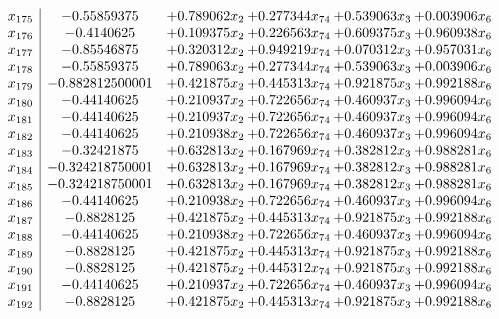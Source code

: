 \documentclass[11pt]{article}
\begin{document}
\[\begin{array}{c| c c@{\hskip 2pt} c@{\hskip 2pt} c@{\hskip 2pt} c@{\hskip 2pt} }
 x_{175}   &  -0.55859375 & + 0.789062 x_{2} & + 0.277344 x_{74} & + 0.539063 x_{3} & + 0.003906 x_{6}\\
 x_{176}   &  -0.4140625 & + 0.109375 x_{2} & + 0.226563 x_{74} & + 0.609375 x_{3} & + 0.960938 x_{6}\\
 x_{177}   &  -0.85546875 & + 0.320312 x_{2} & + 0.949219 x_{74} & + 0.070312 x_{3} & + 0.957031 x_{6}\\
 x_{178}   &  -0.55859375 & + 0.789063 x_{2} & + 0.277344 x_{74} & + 0.539063 x_{3} & + 0.003906 x_{6}\\
 x_{179}   &  -0.882812500001 & + 0.421875 x_{2} & + 0.445313 x_{74} & + 0.921875 x_{3} & + 0.992188 x_{6}\\
 x_{180}   &  -0.44140625 & + 0.210937 x_{2} & + 0.722656 x_{74} & + 0.460937 x_{3} & + 0.996094 x_{6}\\
 x_{181}   &  -0.44140625 & + 0.210937 x_{2} & + 0.722656 x_{74} & + 0.460937 x_{3} & + 0.996094 x_{6}\\
 x_{182}   &  -0.44140625 & + 0.210938 x_{2} & + 0.722656 x_{74} & + 0.460937 x_{3} & + 0.996094 x_{6}\\
 x_{183}   &  -0.32421875 & + 0.632813 x_{2} & + 0.167969 x_{74} & + 0.382812 x_{3} & + 0.988281 x_{6}\\
 x_{184}   &  -0.324218750001 & + 0.632813 x_{2} & + 0.167969 x_{74} & + 0.382812 x_{3} & + 0.988281 x_{6}\\
 x_{185}   &  -0.324218750001 & + 0.632813 x_{2} & + 0.167969 x_{74} & + 0.382812 x_{3} & + 0.988281 x_{6}\\
 x_{186}   &  -0.44140625 & + 0.210938 x_{2} & + 0.722656 x_{74} & + 0.460937 x_{3} & + 0.996094 x_{6}\\
 x_{187}   &  -0.8828125 & + 0.421875 x_{2} & + 0.445313 x_{74} & + 0.921875 x_{3} & + 0.992188 x_{6}\\
 x_{188}   &  -0.44140625 & + 0.210938 x_{2} & + 0.722656 x_{74} & + 0.460937 x_{3} & + 0.996094 x_{6}\\
 x_{189}   &  -0.8828125 & + 0.421875 x_{2} & + 0.445313 x_{74} & + 0.921875 x_{3} & + 0.992188 x_{6}\\
 x_{190}   &  -0.8828125 & + 0.421875 x_{2} & + 0.445312 x_{74} & + 0.921875 x_{3} & + 0.992188 x_{6}\\
 x_{191}   &  -0.44140625 & + 0.210937 x_{2} & + 0.722656 x_{74} & + 0.460937 x_{3} & + 0.996094 x_{6}\\
 x_{192}   &  -0.8828125 & + 0.421875 x_{2} & + 0.445313 x_{74} & + 0.921875 x_{3} & + 0.992188 x_{6}\\

\end{array}\]
\end{document}
